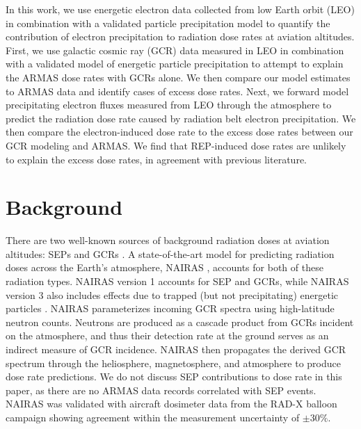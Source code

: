 \documentclass[draft]{agujournal2019}
\begin{document}
In this work, we use energetic electron data collected from low Earth orbit (LEO) in combination with a validated particle precipitation model to quantify the contribution of electron precipitation to radiation dose rates at aviation altitudes. First, we use galactic cosmic ray (GCR) data measured in LEO in combination with a validated model of energetic particle precipitation to attempt to explain the ARMAS dose rates with GCRs alone. We then compare our model estimates to ARMAS data and identify cases of excess dose rates. Next, we forward model precipitating electron fluxes measured from LEO through the atmosphere to predict the radiation dose rate caused by radiation belt electron precipitation. We then compare the electron-induced dose rate to the excess dose rates between our GCR modeling and ARMAS. We find that REP-induced dose rates are unlikely to explain the excess dose rates, in agreement with previous literature.

\section{Background}
There are two well-known sources of background radiation doses at aviation altitudes: SEPs and GCRs \cite{mertens2013}. A state-of-the-art model for predicting radiation doses across the Earth's atmosphere, NAIRAS \cite{mertens2013}, accounts for both of these radiation types. NAIRAS version 1 accounts for SEP and GCRs, while NAIRAS version 3 also includes effects due to trapped (but not precipitating) energetic particles \cite{mertens2025}. NAIRAS parameterizes incoming GCR spectra using high-latitude neutron counts. Neutrons are produced as a cascade product from GCRs incident on the atmosphere, and thus their detection rate at the ground serves as an indirect measure of GCR incidence. NAIRAS then propagates the derived GCR spectrum through the heliosphere, magnetosphere, and atmosphere to produce dose rate predictions. We do not discuss SEP contributions to dose rate in this paper, as there are no ARMAS data records correlated with SEP events. NAIRAS was validated with aircraft dosimeter data from the RAD-X balloon campaign showing agreement within the measurement uncertainty of $\pm 30\%$.
\end{document}
